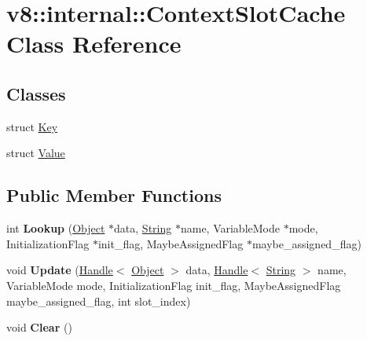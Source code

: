 \hypertarget{classv8_1_1internal_1_1_context_slot_cache}{}\section{v8\+:\+:internal\+:\+:Context\+Slot\+Cache Class Reference}
\label{classv8_1_1internal_1_1_context_slot_cache}
\subsection*{Classes}
\begin{DoxyCompactItemize}
\item 
struct \hyperlink{structv8_1_1internal_1_1_context_slot_cache_1_1_key}{Key}
\item 
struct \hyperlink{structv8_1_1internal_1_1_context_slot_cache_1_1_value}{Value}
\end{DoxyCompactItemize}
\subsection*{Public Member Functions}
\begin{DoxyCompactItemize}
\item 
int {\bfseries Lookup} (\hyperlink{classv8_1_1internal_1_1_object}{Object} $\ast$data, \hyperlink{classv8_1_1internal_1_1_string}{String} $\ast$name, Variable\+Mode $\ast$mode, Initialization\+Flag $\ast$init\+\_\+flag, Maybe\+Assigned\+Flag $\ast$maybe\+\_\+assigned\+\_\+flag)\hypertarget{classv8_1_1internal_1_1_context_slot_cache_a4ebdedd69d39ba5289812097be813f75}{}\label{classv8_1_1internal_1_1_context_slot_cache_a4ebdedd69d39ba5289812097be813f75}

\item 
void {\bfseries Update} (\hyperlink{classv8_1_1internal_1_1_handle}{Handle}$<$ \hyperlink{classv8_1_1internal_1_1_object}{Object} $>$ data, \hyperlink{classv8_1_1internal_1_1_handle}{Handle}$<$ \hyperlink{classv8_1_1internal_1_1_string}{String} $>$ name, Variable\+Mode mode, Initialization\+Flag init\+\_\+flag, Maybe\+Assigned\+Flag maybe\+\_\+assigned\+\_\+flag, int slot\+\_\+index)\hypertarget{classv8_1_1internal_1_1_context_slot_cache_ac136190bbd844c5ccc249b59b4b811bb}{}\label{classv8_1_1internal_1_1_context_slot_cache_ac136190bbd844c5ccc249b59b4b811bb}

\item 
void {\bfseries Clear} ()\hypertarget{classv8_1_1internal_1_1_context_slot_cache_aad0a26c9e44aa6ad4568327171644375}{}\label{classv8_1_1internal_1_1_context_slot_cache_aad0a26c9e44aa6ad4568327171644375}

\end{DoxyCompactItemize}

